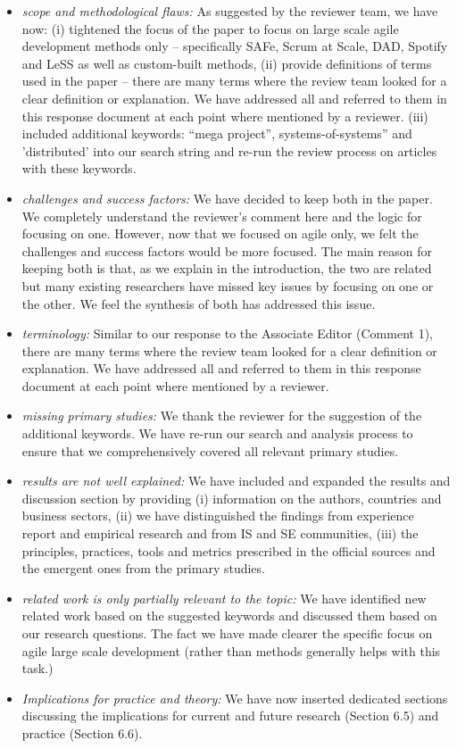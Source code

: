 \documentclass[a4paper,twoside,11pt]{reviewresponse}
\begin{document}
\begin{itemize}
	\item \textit{scope and methodological flaws:} As suggested by the reviewer team, we have now: (i) tightened the focus of the paper to focus on large scale agile development methods only -- specifically SAFe, Scrum at Scale, DAD, Spotify and LeSS as well as custom-built methods, (ii) provide definitions of terms used in the paper -- there are many terms where the review team looked for a clear definition or explanation. We have addressed all and referred to them in this response document at each point where mentioned by a reviewer. (iii)  included additional keywords: ``mega project'', systems-of-systems'' and 'distributed' into our search string and re-run the review process on articles with these keywords.
	\item \textit{challenges and success factors:} We have decided to keep both in the paper. We completely understand the reviewer's comment here and the logic for focusing on one. However, now that we focused on agile only, we felt the challenges and success factors would be more focused. The main reason for keeping both is that, as we explain in the introduction, the two are related but many existing researchers have missed key issues by focusing on one or the other. We feel the synthesis of both has addressed this issue. 
	\item \textit{terminology:} Similar to our response to the Associate Editor (Comment 1), there are many terms where the review team looked for a clear definition or explanation. We have addressed all and referred to them in this response document at each point where mentioned by a reviewer.
	\item \textit{missing primary studies:} We thank the reviewer for the suggestion of the additional keywords. We have re-run our search and analysis process to ensure that we comprehensively covered all relevant primary studies.
	\item \textit{results are not well explained:} We have included and expanded the results and discussion section by providing (i) information on the authors, countries and business sectors, (ii) we have distinguished the findings from experience report and empirical research and from IS and SE communities, (iii) the principles, practices, tools and metrics prescribed in the official sources and the emergent ones from the primary studies.
	\item \textit{related work is only partially relevant to the topic:} We have identified new related work based on the suggested keywords and discussed them based on our research questions. The fact we have made clearer the specific focus on agile large scale development (rather than methods generally helps with this task.)
	\item \textit{Implications for practice and theory:} We have now inserted dedicated sections discussing the implications for current and future research (Section 6.5) and practice (Section 6.6).
\end{itemize}
\end{document}

